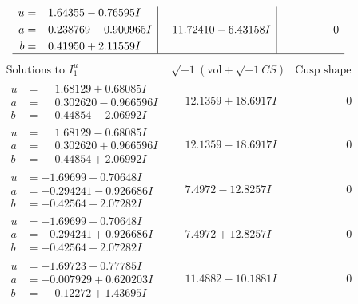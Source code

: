 \documentclass[1p]{elsarticle_modified}
\theoremstyle{definition}
\newcommand{\I}{\sqrt{-1}}
\begin{document}
$$\begin{array}{c|c|c}
\begin{aligned}
u &= \phantom{-}1.64355 - 0.76595 I \\
a &= \phantom{-}0.238769 + 0.900965 I \\
b &= \phantom{-}0.41950 + 2.11559 I\end{aligned}
 & \phantom{-}11.72410 - 6.43158 I & \phantom{-0.000000 } 0\\
 \hline 
 \end{array}$$\newpage$$\begin{array}{c|c|c}  
\text{Solutions to }I^u_{1}& \I (\text{vol} + \sqrt{-1}CS) & \text{Cusp shape}\\
 \hline 
\begin{aligned}
u &= \phantom{-}1.68129 + 0.68085 I \\
a &= \phantom{-}0.302620 - 0.966596 I \\
b &= \phantom{-}0.44854 - 2.06992 I\end{aligned}
 & \phantom{-}12.1359 + 18.6917 I & \phantom{-0.000000 } 0 \\ \hline\begin{aligned}
u &= \phantom{-}1.68129 - 0.68085 I \\
a &= \phantom{-}0.302620 + 0.966596 I \\
b &= \phantom{-}0.44854 + 2.06992 I\end{aligned}
 & \phantom{-}12.1359 - 18.6917 I & \phantom{-0.000000 } 0 \\ \hline\begin{aligned}
u &= -1.69699 + 0.70648 I \\
a &= -0.294241 - 0.926686 I \\
b &= -0.42564 - 2.07282 I\end{aligned}
 & \phantom{-}7.4972 - 12.8257 I & \phantom{-0.000000 } 0 \\ \hline\begin{aligned}
u &= -1.69699 - 0.70648 I \\
a &= -0.294241 + 0.926686 I \\
b &= -0.42564 + 2.07282 I\end{aligned}
 & \phantom{-}7.4972 + 12.8257 I & \phantom{-0.000000 } 0 \\ \hline\begin{aligned}
u &= -1.69723 + 0.77785 I \\
a &= -0.007929 + 0.620203 I \\
b &= \phantom{-}0.12272 + 1.43695 I\end{aligned}
 & \phantom{-}11.4882 - 10.1881 I & \phantom{-0.000000 } 0 \\ \hline\begin{aligned}

\end{aligned}
\end{array}$$
\end{document}
